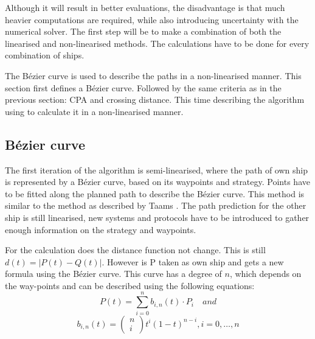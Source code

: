 Although it will result in better evaluations, the disadvantage is that much heavier computations are required, while also introducing uncertainty with the numerical solver. 
The first step will be to make a combination of both the linearised and non-linearised methods. The calculations have to be done for every combination of ships.

The Bézier curve is used to describe the paths in a non-linearised manner. This section first defines a Bézier curve. Followed by the same criteria as in the previous section: \acf{CPA} and crossing distance. This time describing the algorithm using to calculate it in a non-linearised manner.

\subsection{Bézier curve}
The first iteration of the algorithm is semi-linearised, where the path of own ship is represented by a Bézier curve, based on its waypoints and strategy. Points have to be fitted along the planned path to describe the Bézier curve. This method is similar to the method as described by Taams \cite{Taams2018}. The path prediction for the other ship is still linearised, new systems and protocols have to be introduced to gather enough information on the strategy and waypoints.

For the calculation does the distance function not change. This is still $
d(t) = |P(t) - Q(t)|$. However is P taken as own ship and gets a new formula using the Bézier curve. This curve has a degree of $n$, which depends on the way-points and can be described using the following equations:
\begin{equation}
P(t) = \sum\limits_{i=0}^n b_{i,n}(t) \cdot P_i \quad and
\end{equation}
\begin{equation}
b_{i,n}(t) = \left( \begin{array}{c} n \\ i \end{array}\right) t^i(1-t)^{n-i}, i = 0,\dots,n
\end{equation}

